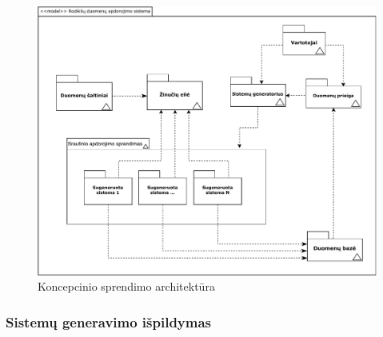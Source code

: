 \documentclass{VUMIFPSbakalaurinis}
\begin{document}
\begin{figure}[H]
    \centering
    \includegraphics[width=1\textwidth]{img/architekturos_diagrama.pdf}
    \caption{Koncepcinio sprendimo architektūra}
    \label{img:concept}
\end{figure}

\subsubsection{Sistemų generavimo išpildymas}
\end{document}
